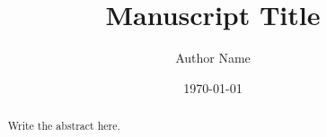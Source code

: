 \documentclass[11pt]{article}
\title{Manuscript Title}
\author{Author Name}
\date{\today}
\begin{document}
\maketitle

\begin{abstract}
Write the abstract here.
\end{abstract}








\end{document}
